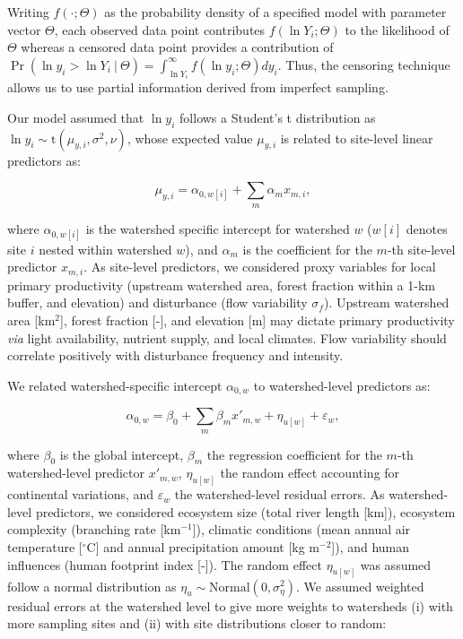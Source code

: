 \documentclass[11pt, class=article, crop=false]{standalone}
\begin{document}
Writing $f(\cdot;\Theta)$ as the probability density of a specified model with parameter vector $\Theta$, each observed data point contributes $f(\ln Y_i;\Theta)$ to the likelihood of $\Theta$ whereas a censored data point provides a contribution of $\Pr(\ln y_i > \ln Y_i~|~\Theta) = \int_{\ln Y_i}^{\infty} f(\ln y_i;\Theta) dy_i$.
Thus, the censoring technique allows us to use partial information derived from imperfect sampling.

Our model assumed that $\ln y_i$ follows a Student's t distribution as $\ln y_i \sim \mbox{t}(\mu_{y,i}, \sigma^2, \nu)$, whose expected value $\mu_{y,i}$ is related to site-level linear predictors as:

\begin{equation}
    \mu_{y,i} = \alpha_{0, w[i]} + \sum_m \alpha_m x_{m,i},
\end{equation}

where $\alpha_{0, w[i]}$ is the watershed specific intercept for watershed $w$ ($w[i]$ denotes site $i$ nested within watershed $w$), and $\alpha_m$ is the coefficient for the $m$-th site-level predictor $x_{m, i}$.
As site-level predictors, we considered proxy variables for local primary productivity (upstream watershed area, forest fraction within a 1-km buffer, and elevation) and disturbance (flow variability $\sigma_f$).
Upstream watershed area [km$^2$], forest fraction [-], and elevation [m] may dictate primary productivity \textit{via} light availability, nutrient supply, and local climates.
Flow variability should correlate positively with disturbance frequency and intensity.

We related watershed-specific intercept $\alpha_{0, w}$ to watershed-level predictors as:

\begin{equation}
    \alpha_{0, w} = \beta_0 + \sum_m \beta_m x'_{m, w} + \eta_{u[w]} + \varepsilon_{w},
\end{equation}

where $\beta_0$ is the global intercept, $\beta_m$ the regression coefficient for the $m$-th watershed-level predictor $x'_{m, w}$, $\eta_{u[w]}$ the random effect accounting for continental variations, and $\varepsilon_w$ the watershed-level residual errors.
As watershed-level predictors, we considered ecosystem size (total river length [km]), ecosystem complexity (branching rate [km$^{-1}$]), climatic conditions (mean annual air temperature [$^\circ$C] and annual precipitation amount [kg m$^{-2}$]), and human influences (human footprint index [-]).
The random effect $\eta_{u[w]}$ was assumed follow a normal distribution as $\eta_{u} \sim \mbox{Normal}(0, \sigma_{\eta}^2)$.
We assumed weighted residual errors at the watershed level to give more weights to watersheds (i) with more sampling sites and (ii) with site distributions closer to random:
\end{document}
